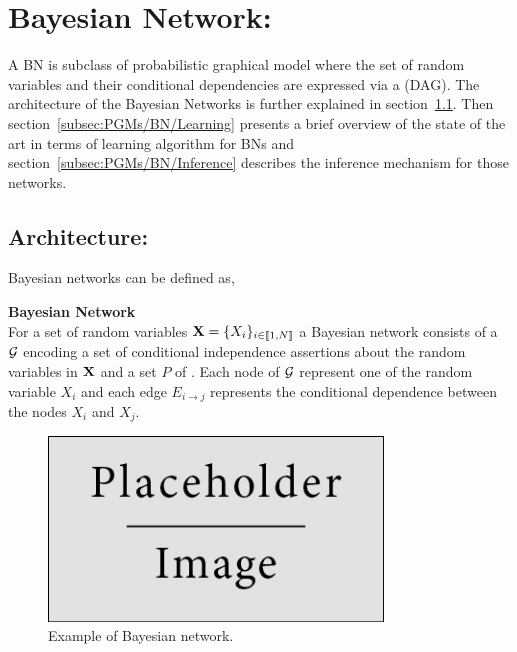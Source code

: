\documentclass[a4paper,11pt]{report}
\begin{document}
  \section{Bayesian Network:}  
    \label{sec:PGMs/BN}
    A BN is subclass of probabilistic graphical model where the set of random variables and their conditional dependencies are expressed via a  (DAG). The architecture of the Bayesian Networks is further explained in section~\ref{subsec:PGMs/BN/Architecture}. Then section~\ref{subsec:PGMs/BN/Learning} presents a brief overview of the state of the art in terms of learning algorithm for BNs and section~\ref{subsec:PGMs/BN/Inference} describes the inference mechanism for those networks.
        
    \subsection{Architecture:}
      \label{subsec:PGMs/BN/Architecture}
      
      Bayesian networks can be defined as,
      
      \begin{defn} \textbf{Bayesian Network}\\
				For a set of random variables ${\bf X} = \{X_{i}\}_{i \in \llbracket1,N \rrbracket}$ a Bayesian network consists of a  $\mathcal{G}$ encoding a set of conditional independence assertions about the random variables in ${\bf X}$ and  a set $P$ of . Each node of $\mathcal{G}$ represent one of the random variable $X_{i}$ and each edge $E_{i \rightarrow j}$ represents the conditional dependence between the nodes $X_{i}$ and $X_{j}$.
				\label{def:BN}
      \end{defn}
     
			\begin{figure}
				\begin{center}
					\includegraphics[width=3.5in]{placeholder.jpg}
					\caption{Example of Bayesian network.} %
					\label{fig:Eg BN}
				\end{center}
			\end{figure}
\end{document}
